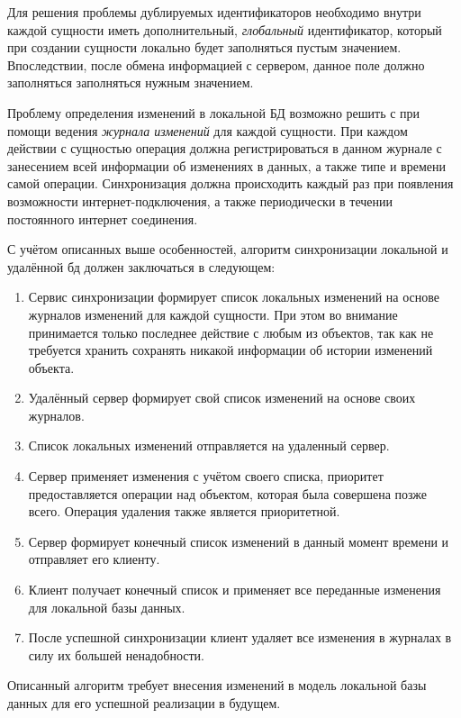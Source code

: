 Для решения проблемы дублируемых идентификаторов необходимо внутри каждой сущности иметь дополнительный, \emph{глобальный} идентификатор, который при создании сущности локально будет заполняться пустым значением.
Впоследствии, после обмена информацией с сервером, данное поле должно заполняться заполняться нужным значением.

Проблему определения изменений в локальной БД возможно решить с при помощи ведения \emph{журнала изменений} для каждой сущности.
При каждом действии с сущностью операция должна регистрироваться в данном журнале с занесением всей информации об изменениях в данных, а также типе и времени самой операции.
Синхронизация должна происходить каждый раз при появления возможности интернет-подключения, а также периодически в течении постоянного интернет соединения.

С учётом описанных выше особенностей, алгоритм синхронизации локальной и удалённой бд должен заключаться в следующем:
\begin{enumerate}
    \item Сервис синхронизации формирует список локальных изменений на основе журналов изменений для каждой сущности.
    При этом во внимание принимается только последнее действие с любым из объектов, так как не требуется хранить сохранять никакой информации об истории изменений объекта.
    \item Удалённый сервер формирует свой список изменений на основе своих журналов.
    \item Список локальных изменений отправляется на удаленный сервер.
    \item Сервер применяет изменения с учётом своего списка, приоритет предоставляется операции над объектом, которая была совершена позже всего.
    Операция удаления также является приоритетной.
    \item Сервер формирует конечный список изменений в данный момент времени и отправляет его клиенту.
    \item Клиент получает конечный список и применяет все переданные изменения для локальной базы данных.
    \item После успешной синхронизации клиент удаляет все изменения в журналах в силу их большей ненадобности.
\end{enumerate}

Описанный алгоритм требует внесения изменений в модель локальной базы данных для его успешной реализации в будущем.